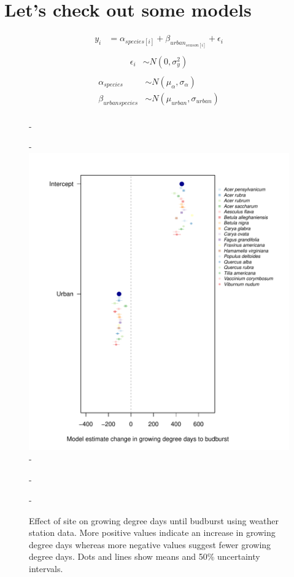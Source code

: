 \documentclass{article}\usepackage[]{graphicx}\usepackage[]{color}
\begin{document}
\renewcommand{\thetable}{\arabic{table}}
\renewcommand{\thefigure}{\arabic{figure}}
\renewcommand{\labelitemi}{$-$}


\section*{Let's check out some models}


\begin{align*}
y_i &= \alpha_{species[i]} + \beta_{urban_{season[i]}} + \epsilon_i\\
\end{align*}
\begin{align*}
\epsilon_i & \sim N(0,\sigma^2_y) \\
\end{align*}
\begin{align*}
\alpha_{species} & \sim N(\mu_{\alpha}, \sigma_{\alpha}) \\
\beta_{urban{species}} & \sim N(\mu_{urban}, \sigma_{urban}) \\
\end{align*}

{\begin{figure} [H]
  -\begin{center}
  -\includegraphics[width=12cm]{..//analyses/figures/muplotws_urb.pdf}
  -\caption{Effect of site on growing degree days until budburst using weather station data. More positive values indicate an increase in growing degree days whereas more negative values suggest fewer growing degree days. Dots and lines show means and 50\% uncertainty intervals.}
  -\end{center}
  -\end{figure}}
\end{document}
